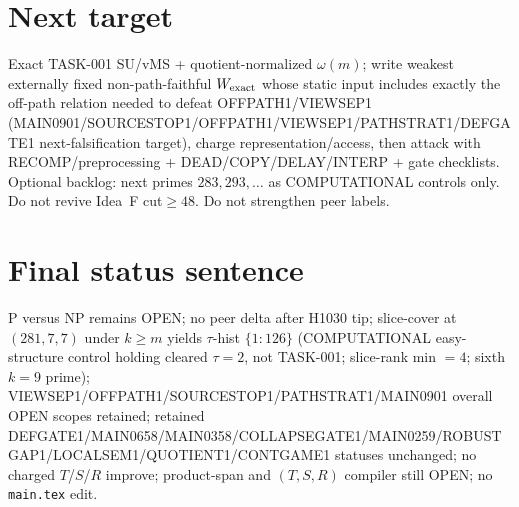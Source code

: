 \documentclass[11pt]{article}
\begin{document}
\section*{Next target}
Exact TASK-001 SU/vMS + quotient-normalized $\omega(m)$; write weakest externally fixed non-path-faithful
$W_{\rm exact}$ whose static input includes exactly the off-path relation needed to defeat OFFPATH1/VIEWSEP1
(MAIN0901/SOURCESTOP1/OFFPATH1/VIEWSEP1/PATHSTRAT1/DEFGATE1 next-falsification target), charge representation/access,
then attack with RECOMP/preprocessing + DEAD/COPY/DELAY/INTERP + gate checklists.
Optional backlog: next primes $283,293,\ldots$ as COMPUTATIONAL controls only.
Do not revive Idea~F cut$\ge48$. Do not strengthen peer labels.

\section*{Final status sentence}
P versus NP remains OPEN; no peer delta after H1030 tip; slice-cover at $(281,7,7)$ under $k{\ge}m$ yields $\tau$-hist $\{1{:}126\}$ (COMPUTATIONAL easy-structure control holding cleared $\tau{=}2$, not TASK-001; slice-rank min $=4$; sixth $k{=}9$ prime); VIEWSEP1/OFFPATH1/SOURCESTOP1/PATHSTRAT1/MAIN0901 overall OPEN scopes retained; retained DEFGATE1/MAIN0658/MAIN0358/COLLAPSEGATE1/MAIN0259/ROBUSTGAP1/LOCALSEM1/QUOTIENT1/CONTGAME1 statuses unchanged; no charged $T$/$S$/$R$ improve; product-span and $(T,S,R)$ compiler still OPEN; no \texttt{main.tex} edit.
\end{document}
